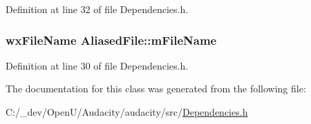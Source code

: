 Definition at line 32 of file Dependencies.\+h.

\subsubsection[{\texorpdfstring{m\+File\+Name}{mFileName}}]{\setlength{\rightskip}{0pt plus 5cm}wx\+File\+Name Aliased\+File\+::m\+File\+Name}\hypertarget{class_aliased_file_a83062f1072558a69ad9f5a871967abc9}{}\label{class_aliased_file_a83062f1072558a69ad9f5a871967abc9}


Definition at line 30 of file Dependencies.\+h.



The documentation for this class was generated from the following file\+:\begin{DoxyCompactItemize}
\item 
C\+:/\+\_\+dev/\+Open\+U/\+Audacity/audacity/src/\hyperlink{_dependencies_8h}{Dependencies.\+h}\end{DoxyCompactItemize}
